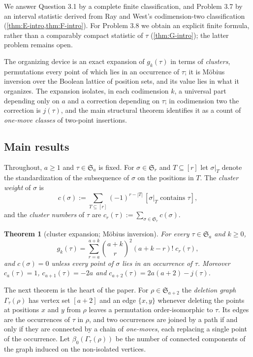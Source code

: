 \documentclass[11pt,reqno]{amsart}
\theoremstyle{plain}
\newtheorem{theorem}{Theorem}[section]
\theoremstyle{definition}
\theoremstyle{remark}
\newcommand{\bb}[1]{\left[#1\right]}
\newcommand{\Sym}{\mathfrak{S}}
\newcommand{\Gam}{\Gamma}
\newcommand{\bz}{\beta_0}
\begin{document}
We answer Question 3.1 by a complete finite classification, and Problem 3.7
by an interval statistic derived from Ray and West's codimension-two
classification (\cref{thm:E-intro,thm:F-intro}). For Problem 3.8 we obtain
an explicit finite formula, rather than a comparably compact statistic
of $\tau$ (\cref{thm:G-intro}); the latter problem remains open.

The organizing device is an exact expansion of $g_k(\tau)$ in terms of \emph{clusters}, permutations every point of which lies in an occurrence of $\tau$; it is Möbius inversion over the Boolean lattice of position sets, and its value lies in what it organizes. The expansion isolates, in each codimension $k$, a universal part depending only on $a$ and a correction depending on $\tau$; in codimension two the correction is $j(\tau)$, and the main structural theorem identifies it as a count of \emph{one-move classes} of two-point insertions.

\subsection{Main results}\label{sec:main}

Throughout, $a\ge1$ and $\tau\in\Sym_a$ is fixed. For $\sigma\in\Sym_r$ and $T\subseteq[r]$ let $\sigma|_T$ denote the standardization of the subsequence of $\sigma$ on the positions in $T$. The \emph{cluster weight} of $\sigma$ is
\begin{equation}\label{eq:cw}
c(\sigma):=\sum_{T\subseteq[r]}(-1)^{r-|T|}\,\bb{\sigma|_T\text{ contains }\tau},
\end{equation}
and the \emph{cluster numbers} of $\tau$ are $c_r(\tau):=\sum_{\sigma\in\Sym_r}c(\sigma)$.

\begin{theorem}[cluster expansion; Möbius inversion]\label{thm:A-intro}
For every $\tau\in\Sym_a$ and $k\ge0$,
\begin{equation}\label{eq:clusterexp}
g_k(\tau)=\sum_{r=a}^{a+k}\binom{a+k}{r}^2(a+k-r)!\;c_r(\tau),
\end{equation}
and $c(\sigma)=0$ unless every point of $\sigma$ lies in an occurrence of $\tau$. Moreover $c_a(\tau)=1$, $c_{a+1}(\tau)=-2a$ and $c_{a+2}(\tau)=2a(a+2)-j(\tau)$.
\end{theorem}

The next theorem is the heart of the paper. For $\rho\in\Sym_{a+2}$ the \emph{deletion graph} $\Gam_\tau(\rho)$ has vertex set $[a+2]$ and an edge $\{x,y\}$ whenever deleting the points at positions $x$ and $y$ from $\rho$ leaves a permutation order-isomorphic to $\tau$. Its edges are the occurrences of $\tau$ in $\rho$, and two occurrences are joined by a path if and only if they are connected by a chain of \emph{one-moves}, each replacing a single point of the occurrence. Let $\bz(\Gam_\tau(\rho))$ be the number of connected components of the graph induced on the non-isolated vertices.
\end{document}
